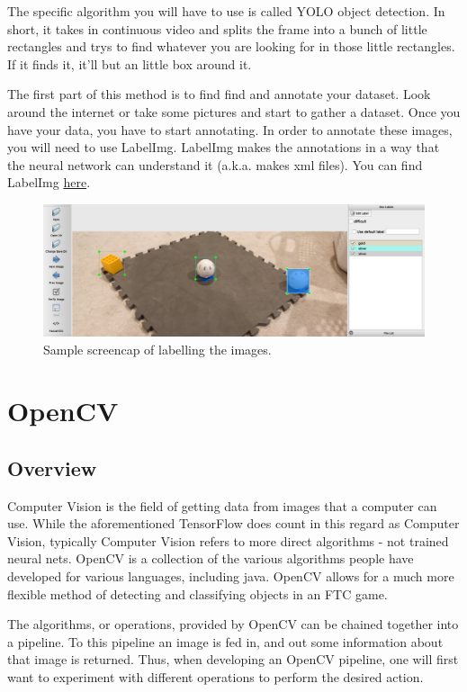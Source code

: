\documentclass[../main.tex]{subfiles}
\begin{document}
The specific algorithm you will have to use is called YOLO object detection. In short, it takes in continuous video and splits the frame into a bunch of little rectangles and trys to find whatever you are looking for in those little rectangles. If it finds it, it'll but an little box around it. 

The first part of this method is to find find and annotate your dataset. Look around the internet or take some pictures and start to gather a dataset. Once you have your data, you have to start annotating. In order to annotate these images, you will need to use LabelImg. LabelImg makes the annotations in a way that the neural network can understand it (a.k.a. makes xml files). You can find LabelImg  \href{https://github.com/tzutalin/labelImg}{here}.

\begin{figure}[H]
    \centering
    \includegraphics[width=400pt]{sections/vision/images/LabelImg.png}
    \caption{Sample screencap of labelling the images.}
\end{figure}

\section{OpenCV}
\subsection{Overview}
Computer Vision is the field of getting data from images that a computer can use. While the aforementioned TensorFlow does count in this regard as Computer Vision, typically Computer Vision refers to more direct algorithms - not trained neural nets. OpenCV is a collection of the various algorithms people have developed for various languages, including java. OpenCV allows for a much more flexible method of detecting and classifying objects in an FTC game.

The algorithms, or operations, provided by OpenCV can be chained together into a pipeline. To this pipeline an image is fed in, and out some information about that image is returned. Thus, when developing an OpenCV pipeline, one will first want to experiment with different operations to perform the desired action.
\end{document}
